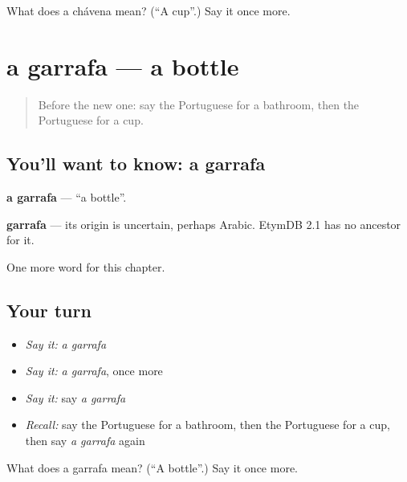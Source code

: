 \begin{tcolorbox}[breakable,colback=teal!4,colframe=teal!35!black,title={Before you move on}]
What does a chávena mean? (\textquotedblleft{}A cup\textquotedblright{}.) Say it once more.
\end{tcolorbox}
\section[a garrafa]{a garrafa — a bottle}

\label{lesson:PT-C99-garrafa}



\begin{quote}
Before the new one: say the Portuguese for a bathroom, then the Portuguese for a cup.
\end{quote}

\subsection*{You'll want to know: a garrafa}
\textbf{a garrafa} — \textquotedblleft{}a bottle\textquotedblright{}.

\begin{cousinweb}
\textbf{garrafa} — its origin is uncertain, perhaps Arabic. EtymDB 2.1 has no ancestor for it.
\end{cousinweb}

\begin{grammarlens}[title={What you've built}]
One more word for this chapter.
\end{grammarlens}

\subsection*{Your turn}
\begin{itemize}
\raggedright
  \item \emph{Say it:} \emph{a garrafa}
  \item \emph{Say it:} \emph{a garrafa}, once more
  \item \emph{Say it:} say \emph{a garrafa}
  \item \emph{Recall:} say the Portuguese for a bathroom, then the Portuguese for a cup, then say \emph{a garrafa} again
\end{itemize}

\begin{tcolorbox}[breakable,colback=teal!4,colframe=teal!35!black,title={Before you move on}]
What does a garrafa mean? (\textquotedblleft{}A bottle\textquotedblright{}.) Say it once more.
\end{tcolorbox}
